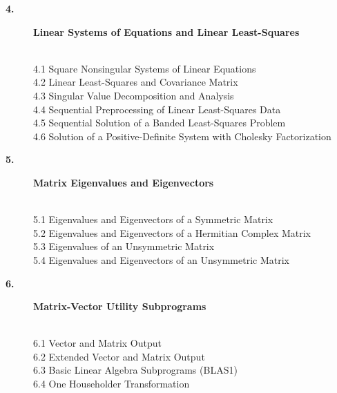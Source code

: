 \documentclass[twoside]{MATH77}
\begin{document}
\begin{description}
\item[\large \bf 4.]  {\large {\bf Linear Systems of Equations and Linear
Least-Squares}}

\vspace{-20pt}
\begin{tabbing}
\hspace{.45in}\=\\
\phantom{1}4.1 \> Square Nonsingular Systems of Linear Equations\\
\phantom{1}4.2 \> Linear Least-Squares and Covariance Matrix\\
\phantom{1}4.3 \> Singular Value Decomposition and Analysis\\
\phantom{1}4.4 \> Sequential Preprocessing of Linear Least-Squares Data\\
\phantom{1}4.5 \> Sequential Solution of a Banded Least-Squares Problem\\
\phantom{1}4.6 \> Solution of a Positive-Definite System with Cholesky
Factorization\\
\end{tabbing}\vspace{-15pt}

\newpage
\item[\large \bf 5.]  {\large {\bf Matrix Eigenvalues and Eigenvectors}}

\vspace{-20pt}
\begin{tabbing}
\hspace{.45in}\=\\
\phantom{1}5.1 \> Eigenvalues and Eigenvectors of a Symmetric Matrix\\
\phantom{1}5.2 \> Eigenvalues and Eigenvectors of a Hermitian Complex Matrix\\
\phantom{1}5.3 \> Eigenvalues of an Unsymmetric Matrix\\
\phantom{1}5.4 \> Eigenvalues and Eigenvectors of an Unsymmetric Matrix\\
\end{tabbing}\vspace{-15pt}

\item[\large \bf 6.]  {\large {\bf Matrix-Vector Utility Subprograms}}

\vspace{-20pt}
\begin{tabbing}
\hspace{.45in}\=\\
\phantom{1}6.1 \> Vector and Matrix Output\\
\phantom{1}6.2 \> Extended Vector and Matrix Output\\
\phantom{1}6.3 \> Basic Linear Algebra Subprograms (BLAS1)\\
\phantom{1}6.4 \> One Householder Transformation\\
\end{tabbing}\vspace{-15pt}


\end{description}
\end{document}
